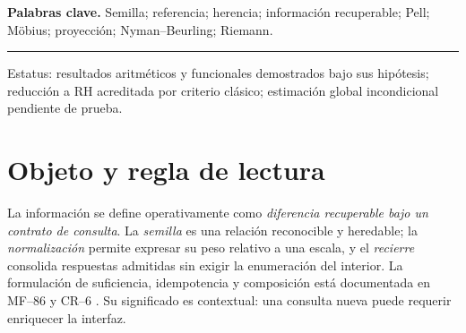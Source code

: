 \documentclass[11pt,a4paper]{article}
\theoremstyle{mine}
\theoremstyle{definition}
\newcommand{\WW}{\mathcal W}
\newcommand{\RH}{\mathrm{RH}}
\begin{document}
\textbf{Palabras clave.} Semilla; referencia; herencia; información recuperable; Pell; Möbius; proyección; Nyman--Beurling; Riemann.
\vspace{6pt}
\begin{center}
\end{center}
\vfill
\rule{\linewidth}{.5pt}
{\footnotesize\color{Faint}Estatus: resultados aritméticos y funcionales demostrados bajo sus hipótesis; reducción a RH acreditada por criterio clásico; estimación global incondicional pendiente de prueba.}\newpage

\section{Objeto y regla de lectura}

La información se define operativamente como \emph{diferencia recuperable bajo un contrato de consulta}. La \emph{semilla} es una relación reconocible y heredable; la \emph{normalización} permite expresar su peso relativo a una escala, y el \emph{recierre} consolida respuestas admitidas sin exigir la enumeración del interior. La formulación de suficiencia, idempotencia y composición está documentada en MF--86 y CR--6 \cite{MF86,CR6}. Su significado es contextual: una consulta nueva puede requerir enriquecer la interfaz.
\end{document}
